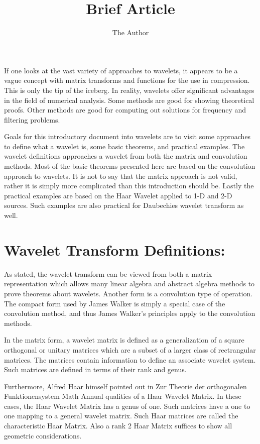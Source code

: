 \documentclass{article}
\begin{document}
\title{Brief Article}
\author{The Author}

If one looks at the vast variety of approaches to wavelets, it appears to be
a vague concept with matrix transforms and functions for the use in
compression. This is only the tip of the iceberg. In reality, wavelets offer
significant advantages in the field of numerical analysis. Some methods are
good for showing theoretical proofs. Other methods are good for computing
out solutions for frequency and filtering problems.

Goals for this introductory document into wavelets are to visit some
approaches to define what a wavelet is, some basic theorems, and practical
examples. The wavelet definitions approaches a wavelet from both the matrix
and convolution methods. Most of the basic theorems presented here are based
on the convolution approach to wavelets. It is not to say that the matrix
approach is not valid, rather it is simply more complicated than this
introduction should be. Lastly the practical examples are based on the Haar
Wavelet applied to 1-D and 2-D sources. Such examples are also practical for
Daubechies wavelet transform as well.

\section{Wavelet Transform Definitions:}

As stated, the wavelet transform can be viewed from both a matrix
representation which allows many linear algebra and abstract algebra methods
to prove theorems about wavelets. Another form is a convolution type of
operation. The compact form used by James Walker is simply a special case of
the convolution method, and thus James Walker's principles apply to the
convolution methods.

In the matrix form, a wavelet matrix is defined as a generalization of a
square orthogonal or unitary matrices which are a subset of a larger class
of rectrangular matrices. The matrices contain information to define an
associate wavelet system. Such matrices are defined in terms of their rank
and genus.

Furthermore, Alfred Haar himself pointed out in Zur Theorie der orthogonalen
Funktionensystem Math Annual qualities of a Haar Wavelet Matrix. In these
cases, the Haar Wavelet Matrix has a genus of one. Such matrices have a one
to one mapping to a general wavelet matrix. Such Haar matrices are called
the characteristic Haar Matrix. Also a rank 2 Haar Matrix suffices to show
all geometric considerations.
\end{document}
